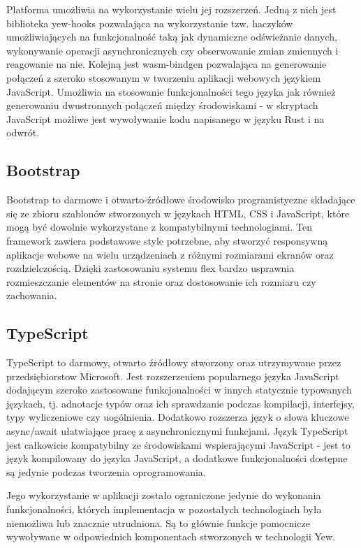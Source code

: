 Platforma umożliwia na wykorzystanie wielu jej rozszerzeń. Jedną z nich jest biblioteka
yew-hooks pozwalająca na wykorzystanie tzw. haczyków umożliwiających na 
funkcjonalność taką jak dynamiczne odświeżanie danych, wykonywanie operacji
asynchronicznych czy obserwowanie zmian zmiennych i reagowanie na nie.
Kolejną jest wasm-bindgen pozwalająca na generowanie połączeń z szeroko stosowanym
w tworzeniu aplikacji webowych językiem JavaScript. Umożliwia na stosowanie
funkcjonalności tego języka jak również generowaniu dwustronnych połączeń między
środowiskami - w skryptach JavaScript możliwe jest wywoływanie kodu napisanego
w języku Rust i na odwrót.

\subsection*{Bootstrap}
Bootstrap\cite{bootstrap} to darmowe i otwarto-źródłowe środowisko programistyczne składające się
ze zbioru szablonów stworzonych w językach HTML, CSS i JavaScript, które mogą
być dowolnie wykorzystane z kompatybilnymi technologiami.
Ten framework zawiera podstawowe style potrzebne, aby stworzyć responsywną 
aplikacje webowe na wielu urządzeniach z różnymi rozmiarami ekranów oraz rozdzielczością. 
Dzięki zastosowaniu systemu flex bardzo usprawnia rozmieszczanie elementów na stronie
oraz dostosowanie ich rozmiaru czy zachowania.

\subsection*{TypeScript}
TypeScript\cite{typescript} to darmowy, otwarto źródłowy stworzony oraz utrzymywane przez przedsiębiorstow Microsoft.
Jest rozszerzeniem popularnego języka JavaScript dodającym szeroko zastosowane funkcjonalności
w innych statycznie typowanych językach, tj. adnotacje typów oraz ich sprawdzanie
podczas kompilacji, interfejsy, typy wyliczeniowe czy uogólnienia.
Dodatkowo rozszerza język o słowa kluczowe async/await ułatwiające pracę
z asynchronicznymi funkcjami. Język TypeScript jest całkowicie kompatybilny ze 
środowiskami wspierającymi JavaScript - jest to język kompilowany do języka JavaScript, a
dodatkowe funkcjonalności dostępne są jedynie podczas tworzenia oprogramowania.

Jego wykorzystanie w aplikacji zostało ograniczone jedynie do wykonania funkcjonalności,
których implementacja w pozostałych technologiach była niemożliwa lub znacznie 
utrudniona. Są to głównie funkcje pomocnicze wywoływane w odpowiednich komponentach
stworzonych w technologii Yew.

